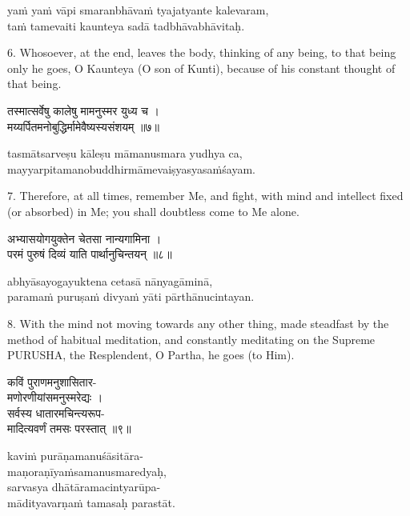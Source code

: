 \begin{transliteration}
yaṁ yaṁ vāpi smaranbhāvaṁ tyajatyante kalevaram, \\
taṁ tamevaiti kaunteya sadā tadbhāvabhāvitaḥ.
\end{transliteration}

6. Whosoever, at the end, leaves the body, thinking of any being, to that being
only he goes, O Kaunteya (O son of Kunti), because of his constant thought of
that being.

\begin{gitaverse}
तस्मात्सर्वेषु कालेषु मामनुस्मर युध्य च । \\
मय्यर्पितमनोबुद्धिर्मामेवैष्यस्यसंशयम् ॥७॥
\end{gitaverse}

\begin{transliteration}
tasmātsarveṣu kāleṣu māmanusmara yudhya ca, \\
mayyarpitamanobuddhirmāmevaiṣyasyasaṁśayam.
\end{transliteration}

7. Therefore, at all times, remember Me, and fight, with mind and intellect
fixed (or absorbed) in Me; you shall doubtless come to Me alone.

\begin{gitaverse}
अभ्यासयोगयुक्तेन चेतसा नान्यगामिना । \\
परमं पुरुषं दिव्यं याति पार्थानुचिन्तयन् ॥८॥
\end{gitaverse}

\begin{transliteration}
abhyāsayogayuktena cetasā nānyagāminā, \\
paramaṁ puruṣaṁ divyaṁ yāti pārthānucintayan.
\end{transliteration}

8. With the mind not moving towards any other thing, made steadfast by the
method of habitual meditation, and constantly meditating on the Supreme
PURUSHA, the Resplendent, O Partha, he goes (to Him).

\begin{gitaverse}
कविं पुराणमनुशासितार- \\
\tab मणोरणीयांसमनुस्मरेद्यः । \\
सर्वस्य धातारमचिन्त्यरूप- \\
\tab मादित्यवर्णं तमसः परस्तात् ॥९॥
\end{gitaverse}

\begin{transliteration}
kaviṁ purāṇamanuśāsitāra- \\
\tab maṇoraṇīyaṁsamanusmaredyaḥ, \\
sarvasya dhātāramacintyarūpa- \\
\tab mādityavarṇaṁ tamasaḥ parastāt.
\end{transliteration}

